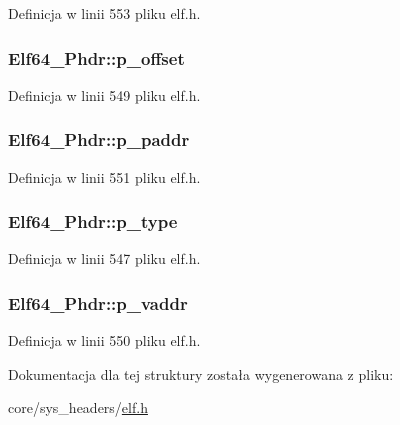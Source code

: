 Definicja w linii 553 pliku elf.\-h.

\hypertarget{struct_elf64___phdr_aa2d51fb4517ded0c74903f8d0c9abea7}{
\subsubsection[{p\-\_\-offset}]{ Elf64\-\_\-\-Phdr\-::p\-\_\-offset}}\label{struct_elf64___phdr_aa2d51fb4517ded0c74903f8d0c9abea7}


Definicja w linii 549 pliku elf.\-h.

\hypertarget{struct_elf64___phdr_a83f4adb032fc307f5af79bdee5ef692d}{
\subsubsection[{p\-\_\-paddr}]{ Elf64\-\_\-\-Phdr\-::p\-\_\-paddr}}\label{struct_elf64___phdr_a83f4adb032fc307f5af79bdee5ef692d}


Definicja w linii 551 pliku elf.\-h.

\hypertarget{struct_elf64___phdr_aee6ec430eaaf8b8faf82ae6397282cb3}{
\subsubsection[{p\-\_\-type}]{ Elf64\-\_\-\-Phdr\-::p\-\_\-type}}\label{struct_elf64___phdr_aee6ec430eaaf8b8faf82ae6397282cb3}


Definicja w linii 547 pliku elf.\-h.

\hypertarget{struct_elf64___phdr_a5c69879e1229b175020ff011af46fcb9}{
\subsubsection[{p\-\_\-vaddr}]{ Elf64\-\_\-\-Phdr\-::p\-\_\-vaddr}}\label{struct_elf64___phdr_a5c69879e1229b175020ff011af46fcb9}


Definicja w linii 550 pliku elf.\-h.



Dokumentacja dla tej struktury została wygenerowana z pliku\-:\begin{DoxyCompactItemize}
\item 
core/sys\-\_\-headers/\hyperlink{elf_8h}{elf.\-h}\end{DoxyCompactItemize}
